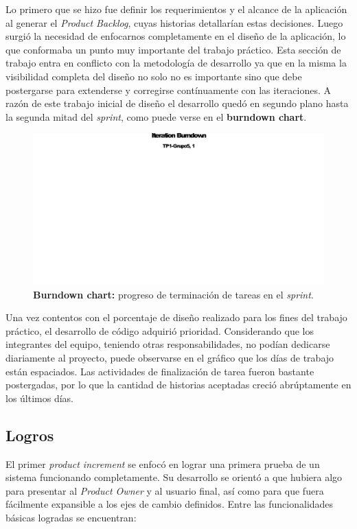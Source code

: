 \documentclass[10pt, a4paper]{article}
\begin{document}
Lo primero que se hizo fue definir los requerimientos y el alcance de la aplicación al generar el \emph{Product Backlog}, cuyas historias detallarían estas decisiones. Luego surgió la necesidad de enfocarnos completamente en el diseño de la aplicación, lo que conformaba un punto muy importante del trabajo práctico. Esta sección de trabajo entra en conflicto con la metodología de desarrollo ya que en la misma la visibilidad completa del diseño no solo no es importante sino que debe postergarse para extenderse y corregirse contínuamente con las iteraciones. A razón de este trabajo inicial de diseño el desarrollo quedó en segundo plano hasta la segunda mitad del \emph{sprint}, como puede verse en el \textbf{burndown chart}.

\begin{figure}[H]
\centering
\includegraphics[width=\textwidth]{graphics/iteration_burndown.pdf}
\caption{\textbf{Burndown chart:} progreso de terminación de tareas en el \emph{sprint}.}
\end{figure}

Una vez contentos con el porcentaje de diseño realizado para los fines del trabajo práctico, el desarrollo de código adquirió prioridad. Considerando que los integrantes del equipo, teniendo otras responsabilidades, no podían dedicarse diariamente al proyecto, puede observarse en el gráfico que los días de trabajo están espaciados. Las actividades de finalización de tarea fueron bastante postergadas, por lo que la cantidad de historias aceptadas creció abrúptamente en los últimos días.

\subsection{Logros}

El primer \emph{product increment} se enfocó en lograr una primera prueba de un sistema funcionando completamente. Su desarrollo se orientó a que hubiera algo para presentar al \emph{Product Owner} y al usuario final, así como para que fuera fácilmente expansible a los ejes de cambio definidos. Entre las funcionalidades básicas logradas se encuentran:
\end{document}
